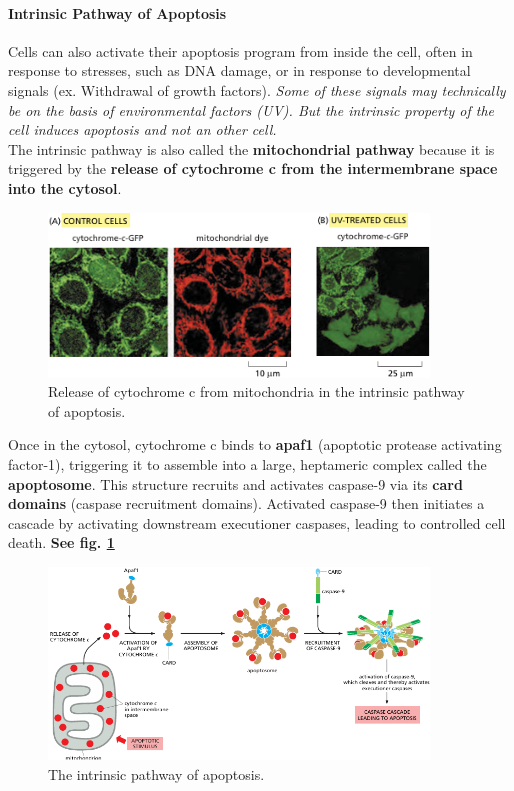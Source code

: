 \documentclass[../main.tex]{subfiles}
\begin{document}
\paragraph{Intrinsic Pathway of Apoptosis}
Cells can also activate their apoptosis program from inside the cell, often in response to stresses, such as DNA damage, or in response to developmental signals (ex. Withdrawal of growth factors). \textit{Some of these signals may technically  be on the basis of environmental factors (UV). But the intrinsic property of the cell induces apoptosis and not an other cell.}\\
\indent The intrinsic pathway is also called the \textbf{mitochondrial pathway} because it is triggered by the\textbf{ release of cytochrome c from the intermembrane space into the cytosol}.
\begin{figure}[H]
	\centering
	\includegraphics[width = 0.9\textwidth]{9}
	\caption{Release of cytochrome c from mitochondria in the intrinsic pathway of apoptosis.}
\end{figure}

Once in the cytosol, cytochrome c binds to \textbf{\gls{apaf1}} (apoptotic protease activating factor-1), triggering it to assemble into a large, heptameric complex called the \textbf{\gls{apoptosome}}. This structure recruits and activates caspase-9 via its \textbf{\gls{card} domains} (caspase recruitment domains). Activated caspase-9 then initiates a cascade by activating downstream executioner caspases, leading to controlled cell death. \textbf{See fig. \ref{intrinsic-pathway}}

\begin{figure}[H]
	\centering
	\includegraphics[width = 0.9\textwidth]{8}
	\caption{The intrinsic pathway of apoptosis.}
	\label{intrinsic-pathway}
\end{figure}
\end{document}
